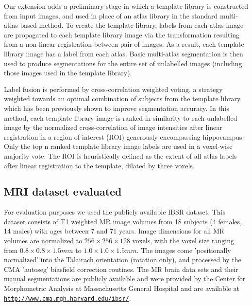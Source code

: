\documentclass{article}\usepackage{graphicx, color}
\begin{document}
Our extension adds a preliminary stage in which a template library is
constructed from input images, and used in place of an atlas library in the
standard multi-atlas-based method.  To create the template library, labels from
each atlas image are propagated to each template library image via the
transformation resulting from a non-linear registration between pair of images.
As a result, each template library image has a label from each atlas.
Basic multi-atlas segmentation is then used to produce segmentations for the
entire set of unlabelled images (including those images used in the template
library). 

Label fusion is performed by cross-correlation weighted voting, a strategy
weighted towards an optimal combination of subjects from the template library
which has been previously shown to improve segmentation
accuracy\cite{Aljabar2009,Collins2010}. In this method, each template library
image is ranked in similarity to each unlabelled image by the normalized
cross-correlation of image intensities after linear registration in a region of
interest (ROI) generously encompassing hippocampus.  Only the top n ranked
template library image labels are used in a voxel-wise majority vote. The ROI
is heuristically defined as the extent of all atlas labels after linear
registration to the template, dilated by three voxels\cite{Chakravarty2012}.

\subsection{MRI dataset evaluated}

For evaluation purposes we used the publicly available IBSR dataset.  This
dataset consists of T1 weighted MR image volumes from 18 subjects (4 females,
14 males) with ages between 7 and 71 years. Image dimensions for all MR volumes
are normalized to  $256  \times 256 \times 128$ voxels, with the voxel size
ranging from $0.8 \times 0.8 \times 1.5 mm$ to $1.0 \times 1.0 \times 1.5 mm$.
The images come 'positionally normalized' into the Talairach orientation
(rotation only), and processed by the CMA 'autoseg' biasfield correction
routines. The MR brain data sets and their manual segmentations are publicly
available and were provided by the Center for Morphometric Analysis at
Massachusetts General Hospital and are available at
\href{http://www.cma.mgh.harvard.edu/ibsr/}
{\nolinkurl{http://www.cma.mgh.harvard.edu/ibsr/}}. 
\end{document}

